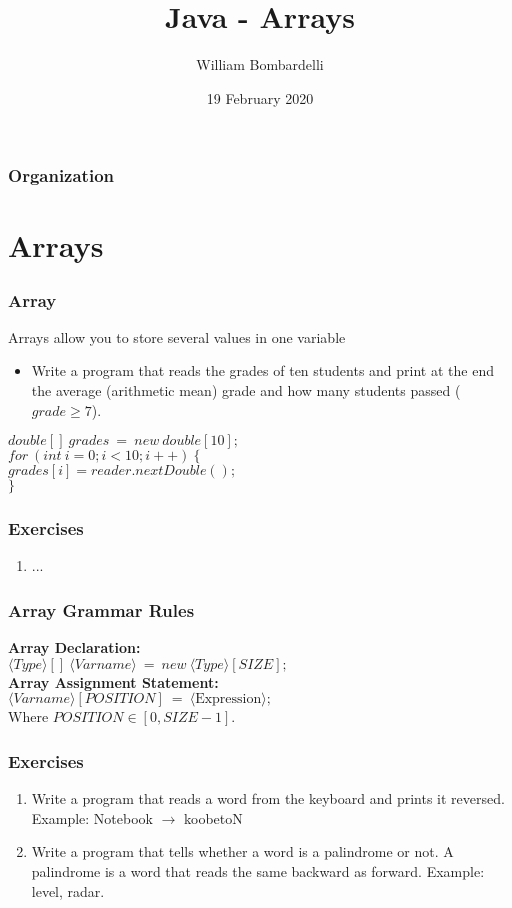 \documentclass{beamer}
\title[Java]{Java - Arrays}
\author[W. Bombardelli]{William Bombardelli}
\institute[Schweizerschule Mexiko]
{
	\vskip 12pt
	Schweizerschule Mexiko, Ciudad de México, Mexico \\
	\texttt{\url{https://github.com/wbombardellis/java-unterricht}}
}
\date{19 February 2020}
\newcommand{\cindent}{\hskip20pt}
\begin{document}
	\begin{frame}
		\titlepage
	\end{frame}
	
	\begin{frame}
		\frametitle{Organization}
		\tableofcontents
	\end{frame}

	\section{Arrays}
	\begin{frame}
		\frametitle{Array}
		Arrays allow you to store several values in one variable
		\pause
		\begin{itemize}
			\item Write a program that reads the grades of ten students and print at the end the average (arithmetic mean) grade and how many students passed ($grade \ge 7$).
		\end{itemize}
		\pause
		$double[]\ grades\ =\ new\ double[10];$\\
		$for\ (int\ i = 0; i < 10; i++)\ \{$\\
			\cindent $grades[i] = reader.nextDouble();$\\
		$\}$\\
	\end{frame}

	\begin{frame}
		\frametitle{Exercises}
		\begin{enumerate}
			\item ...
		\end{enumerate}
	\end{frame}

	\begin{frame}
		\frametitle{Array Grammar Rules}
		\textbf{Array Declaration:}\\
		$\langle Type \rangle []\ \langle Varname \rangle\ =\ new\ \langle Type \rangle [SIZE];$\\
		\vskip20pt
		\textbf{Array Assignment Statement:}\\
		$\langle Varname \rangle [POSITION]\ =\ \langle \text{Expression}\rangle;$\\
		Where $POSITION \in [0, SIZE-1]$.
	\end{frame}

	\begin{frame}
		\frametitle{Exercises}
		\begin{enumerate}
			\item Write a program that reads a word from the keyboard and prints it reversed. Example: Notebook $\to$ koobetoN
			\item Write a program that tells whether a word is a palindrome or not. A palindrome is a word that reads the same backward as forward. Example: level, radar.
		\end{enumerate}
	\end{frame}
\end{document}
